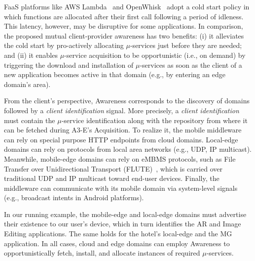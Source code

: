 FaaS platforms like AWS Lambda~\cite{AWSLambda}
and OpenWhisk~\cite{OpenWhisk} adopt a cold start policy in which functions are allocated after their first call following a period of idleness. This latency, however, may be disruptive for some applications. In comparison, the proposed mutual client-provider awareness 
has two benefits: (i) it alleviates the cold start by pro-actively allocating $\mu$-services just before they are needed; and (ii) it enables $\mu$-service acquisition to be opportunistic (i.e., on demand) by triggering the download and installation of $\mu$-services as soon as the client of a new application becomes active in that domain (e.g., by entering an edge domain's area).


%	
%	




From the client's perspective, Awareness corresponds to the discovery of domains followed by a \textit{client identification} signal. More precisely, a \textit{client identification} must contain the $\mu$-service identification along with the repository from where it can be fetched during A3-E's Acquisition. To realize it, the mobile middleware can rely on special purpose HTTP endpoints from cloud domains. Local-edge domains can rely on protocols from local area networks (e.g., UDP, IP multicast). Meanwhile, mobile-edge domains can rely on eMBMS protocols, such as File Transfer over Unidirectional Transport (FLUTE)~\cite{lecompte2012evolved}, which is carried over traditional UDP and IP multicast toward end-user devices. Finally, the middleware can communicate with its mobile domain via system-level signals (e.g., broadcast intents in Android platforms).

In our running example, the mobile-edge and local-edge domains must advertise their existence to our user's device, which in turn identifies the AR and Image Editing applications. The same holds for the hotel's local-edge and the MG application. In all cases, cloud and edge domains can employ Awareness to opportunistically fetch, install, and allocate instances of required $\mu$-services.


